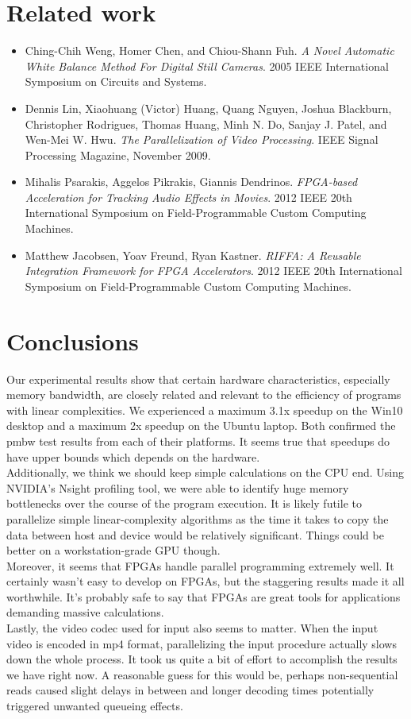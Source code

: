 \documentclass{acm_proc_article-sp}
\begin{document}
\section{Related work}
\begin{itemize}
\item Ching-Chih Weng, Homer Chen, and Chiou-Shann Fuh. \textit{A Novel Automatic White Balance Method For Digital Still Cameras}. 2005 IEEE International Symposium on Circuits and Systems.
\item Dennis Lin, Xiaohuang (Victor) Huang, Quang Nguyen, Joshua Blackburn, Christopher Rodrigues, Thomas Huang, Minh N. Do, Sanjay J. Patel, and Wen-Mei W. Hwu. \textit{The Parallelization of Video Processing}. IEEE Signal Processing Magazine, November 2009.
\item Mihalis Psarakis, Aggelos Pikrakis, Giannis Dendrinos. \textit{FPGA-based Acceleration for Tracking Audio Effects in Movies}. 2012 IEEE 20th International Symposium on Field-Programmable Custom Computing Machines.
\item Matthew Jacobsen, Yoav Freund, Ryan Kastner. \textit{RIFFA: A Reusable Integration Framework for FPGA Accelerators}. 2012 IEEE 20th International Symposium on Field-Programmable Custom Computing Machines.
\end{itemize}

\section{Conclusions}
Our experimental results show that certain hardware characteristics, especially memory bandwidth, are closely related and relevant to the efficiency of programs with linear complexities. We experienced a maximum 3.1x speedup on the Win10 desktop and a maximum 2x speedup on the Ubuntu laptop. Both confirmed the pmbw test results from each of their platforms. It seems true that speedups do have upper bounds which depends on the hardware. \\
Additionally, we think we should keep simple calculations on the CPU end. Using NVIDIA's Nsight profiling tool, we were able to identify huge memory bottlenecks over the course of the program execution. It is likely futile to parallelize simple linear-complexity algorithms as the time it takes to copy the data between host and device would be relatively significant. Things could be better on a workstation-grade GPU though. \\
Moreover, it seems that FPGAs handle parallel programming extremely well. It certainly wasn't easy to develop on FPGAs, but the staggering results made it all worthwhile. It's probably safe to say that FPGAs are great tools for applications demanding massive calculations. \\
Lastly, the video codec used for input also seems to matter. When the input video is encoded in mp4 format, parallelizing the input procedure actually slows down the whole process. It took us quite a bit of effort to accomplish the results we have right now. A reasonable guess for this would be, perhaps non-sequential reads caused slight delays in between and longer decoding times potentially triggered unwanted queueing effects.
\end{document}
